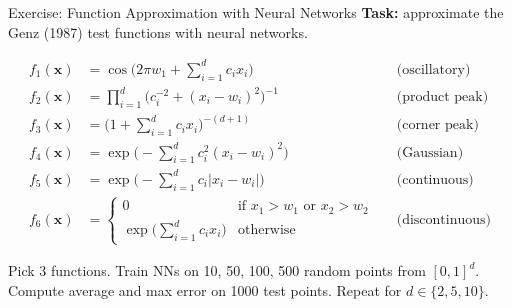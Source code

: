 \documentclass[aspectratio=169,11pt]{beamer}
\newcommand{\x}{\bm{x}}
\begin{document}
\begin{frame}{Exercise: Function Approximation with Neural Networks}
\textbf{Task:} approximate the Genz (1987) test functions with neural networks.

\vspace{0.2cm}
\begin{footnotesize}
\begin{align*}
    f_1(\x) &= \cos\!\Big(2\pi w_1 + \textstyle\sum_{i=1}^{d} c_i x_i\Big) & &\text{(oscillatory)} \\
    f_2(\x) &= \textstyle\prod_{i=1}^{d} \big(c_i^{-2} + (x_i - w_i)^2\big)^{-1} & &\text{(product peak)} \\
    f_3(\x) &= \Big(1 + \textstyle\sum_{i=1}^{d} c_i x_i\Big)^{-(d+1)} & &\text{(corner peak)} \\
    f_4(\x) &= \exp\!\Big(-\textstyle\sum_{i=1}^{d} c_i^2(x_i - w_i)^2\Big) & &\text{(Gaussian)} \\
    f_5(\x) &= \exp\!\Big(-\textstyle\sum_{i=1}^{d} c_i|x_i - w_i|\Big) & &\text{(continuous)} \\
    f_6(\x) &= \begin{cases}0 & \text{if } x_1>w_1 \text{ or } x_2>w_2\\ \exp\!\big(\textstyle\sum_{i=1}^{d}c_i x_i\big) & \text{otherwise}\end{cases} & &\text{(discontinuous)}
\end{align*}
\end{footnotesize}

\vspace{0.1cm}
{\small Pick 3 functions. Train NNs on 10, 50, 100, 500 random points from $[0,1]^d$.  Compute average and max error on 1000 test points.  Repeat for $d\in\{2,5,10\}$.}
\end{frame}
\end{document}
